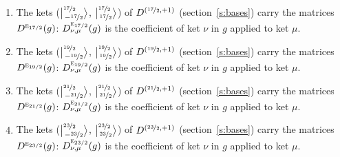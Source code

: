 \documentclass[10pt,a4paper]{article}
\numberwithin{equation}{section}
\newcommand{\irr}[1]{\text{\normalfont\scshape #1}}
\newcommand{\irrJp}[2]{D^{(#1,#2)}}
\newcommand{\repD}[1]{D^{#1}}
\newcommand{\intx}{\mu}
\newcommand{\jm}[2]{\bigl\lvert{}^{#1}_{\,#2}\bigr\rangle}
\newenvironment{romanlist}{\begin{enumerate}%
\renewcommand{\labelenumi}{(\roman{enumi})}}%
  {\end{enumerate}}
\begin{document}
\begin{romanlist}
\item The kets ($\jm{\nicefrac{17}{2}}{-\nicefrac{17}{2}}$, $\jm{\nicefrac{17}{2}}{\nicefrac{17}{2}}$) of $\irrJp{\nicefrac{17}{2}}{+1}$ (section~\ref{s:bases}) carry the matrices $\repD{\irr{e}_{17/2}}(g)$: $\repD{\irr{e}_{17/2}}_{\nu,\intx}(g)$ is the coefficient of ket $\nu$ in $g$ applied to ket $\intx$.
\item The kets ($\jm{\nicefrac{19}{2}}{-\nicefrac{19}{2}}$, $\jm{\nicefrac{19}{2}}{\nicefrac{19}{2}}$) of $\irrJp{\nicefrac{19}{2}}{+1}$ (section~\ref{s:bases}) carry the matrices $\repD{\irr{e}_{19/2}}(g)$: $\repD{\irr{e}_{19/2}}_{\nu,\intx}(g)$ is the coefficient of ket $\nu$ in $g$ applied to ket $\intx$.
\item The kets ($\jm{\nicefrac{21}{2}}{-\nicefrac{21}{2}}$, $\jm{\nicefrac{21}{2}}{\nicefrac{21}{2}}$) of $\irrJp{\nicefrac{21}{2}}{+1}$ (section~\ref{s:bases}) carry the matrices $\repD{\irr{e}_{21/2}}(g)$: $\repD{\irr{e}_{21/2}}_{\nu,\intx}(g)$ is the coefficient of ket $\nu$ in $g$ applied to ket $\intx$.
\item The kets ($\jm{\nicefrac{23}{2}}{-\nicefrac{23}{2}}$, $\jm{\nicefrac{23}{2}}{\nicefrac{23}{2}}$) of $\irrJp{\nicefrac{23}{2}}{+1}$ (section~\ref{s:bases}) carry the matrices $\repD{\irr{e}_{23/2}}(g)$: $\repD{\irr{e}_{23/2}}_{\nu,\intx}(g)$ is the coefficient of ket $\nu$ in $g$ applied to ket $\intx$.
\end{romanlist}
\end{document}
